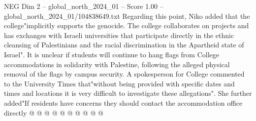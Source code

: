 \begin{textsample}{NEG Dim 2 – global\_north\_2024\_01 – Score 1.00 – global\_north\_2024\_01/104838649.txt}
Regarding this point, Niko added that the college"implicitly supports the genocide.
The college collaborates on projects and has exchanges with Israeli universities that participate directly in the ethnic cleansing of Palestinians and the racial discrimination in the Apartheid state of Israel".
It is unclear if students will continue to hang flags from College accommodations in solidarity with Palestine, following the alleged physical removal of the flags by campus security.
A spokesperson for College commented to the University Times that"without being provided with specific dates and times and locations it is very difficult to investigate these allegations".
She further added"If residents have concerns they should contact the accommodation office directly @ @ @ @ @ @ @ @ @ @

\end{textsample}
